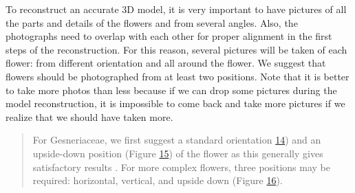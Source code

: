 \documentclass[
]{book}
\begin{document}
To reconstruct an accurate 3D model, it is very important to have
pictures of all the parts and details of the flowers and from several
angles. Also, the photographs need to overlap with each other for proper
alignment in the first steps of the reconstruction. For this reason,
several pictures will be taken of each flower: from different
orientation and all around the flower. We suggest that flowers should be
photographed from at least two positions. Note that it is better to take
more photos than less because if we can drop some pictures during the
model reconstruction, it is impossible to come back and take more
pictures if we realize that we should have taken more.

\begin{quote}
For Gesneriaceae, we first suggest a standard orientation \protect\hyperlink{flowerplacement_1}{14}) and an
upside-down position (Figure
\protect\hyperlink{flowerplacement_2}{15}) of the flower as this generally gives satisfactory
results . For more complex flowers, three
positions may be required: horizontal, vertical, and upside down (Figure
\protect\hyperlink{flowerplacement_3}{16}).
\end{quote}
\end{document}
